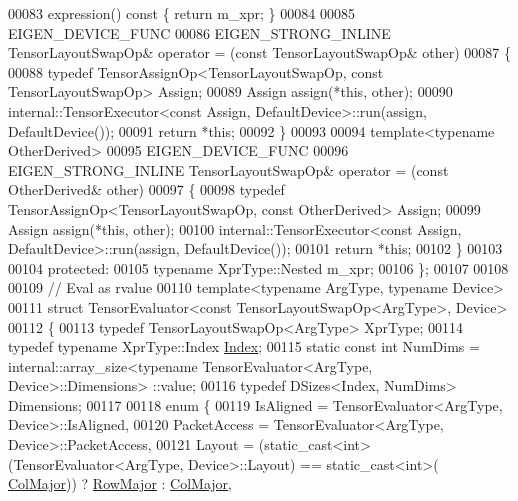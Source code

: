 \begin{DoxyCode}
00083     expression()\textcolor{keyword}{ const }\{ \textcolor{keywordflow}{return} m\_xpr; \}
00084 
00085     EIGEN\_DEVICE\_FUNC
00086     EIGEN\_STRONG\_INLINE TensorLayoutSwapOp& operator = (\textcolor{keyword}{const} TensorLayoutSwapOp& other)
00087     \{
00088       \textcolor{keyword}{typedef} TensorAssignOp<TensorLayoutSwapOp, const TensorLayoutSwapOp> Assign;
00089       Assign assign(*\textcolor{keyword}{this}, other);
00090       internal::TensorExecutor<const Assign, DefaultDevice>::run(assign, DefaultDevice());
00091       \textcolor{keywordflow}{return} *\textcolor{keyword}{this};
00092     \}
00093 
00094     \textcolor{keyword}{template}<\textcolor{keyword}{typename} OtherDerived>
00095     EIGEN\_DEVICE\_FUNC
00096     EIGEN\_STRONG\_INLINE TensorLayoutSwapOp& operator = (\textcolor{keyword}{const} OtherDerived& other)
00097     \{
00098       \textcolor{keyword}{typedef} TensorAssignOp<TensorLayoutSwapOp, const OtherDerived> Assign;
00099       Assign assign(*\textcolor{keyword}{this}, other);
00100       internal::TensorExecutor<const Assign, DefaultDevice>::run(assign, DefaultDevice());
00101       \textcolor{keywordflow}{return} *\textcolor{keyword}{this};
00102     \}
00103 
00104   \textcolor{keyword}{protected}:
00105     \textcolor{keyword}{typename} XprType::Nested m\_xpr;
00106 \};
00107 
00108 
00109 \textcolor{comment}{// Eval as rvalue}
00110 \textcolor{keyword}{template}<\textcolor{keyword}{typename} ArgType, \textcolor{keyword}{typename} Device>
00111 \textcolor{keyword}{struct }TensorEvaluator<const TensorLayoutSwapOp<ArgType>, Device>
00112 \{
00113   \textcolor{keyword}{typedef} TensorLayoutSwapOp<ArgType> XprType;
00114   \textcolor{keyword}{typedef} \textcolor{keyword}{typename} XprType::Index \hyperlink{namespace_eigen_a62e77e0933482dafde8fe197d9a2cfde}{Index};
00115   \textcolor{keyword}{static} \textcolor{keyword}{const} \textcolor{keywordtype}{int} NumDims = internal::array\_size<typename TensorEvaluator<ArgType, Device>::Dimensions>
      ::value;
00116   \textcolor{keyword}{typedef} DSizes<Index, NumDims> Dimensions;
00117 
00118   \textcolor{keyword}{enum} \{
00119     IsAligned = TensorEvaluator<ArgType, Device>::IsAligned,
00120     PacketAccess = TensorEvaluator<ArgType, Device>::PacketAccess,
00121     Layout = (\textcolor{keyword}{static\_cast<}\textcolor{keywordtype}{int}\textcolor{keyword}{>}(TensorEvaluator<ArgType, Device>::Layout) == static\_cast<int>(
      \hyperlink{group__enums_ggaacded1a18ae58b0f554751f6cdf9eb13a0cbd4bdd0abcfc0224c5fcb5e4f6669a}{ColMajor})) ? \hyperlink{group__enums_ggaacded1a18ae58b0f554751f6cdf9eb13acfcde9cd8677c5f7caf6bd603666aae3}{RowMajor} : \hyperlink{group__enums_ggaacded1a18ae58b0f554751f6cdf9eb13a0cbd4bdd0abcfc0224c5fcb5e4f6669a}{ColMajor},

\end{DoxyCode}
